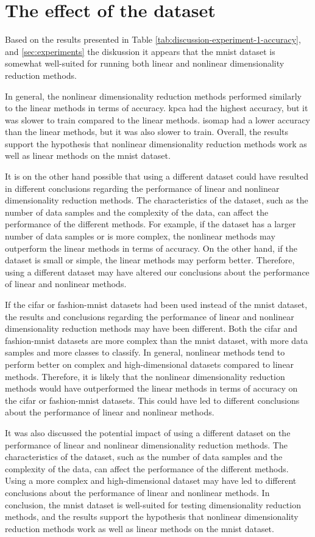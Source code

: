 \section{The effect of the dataset}\label{sec:discussion-of-data}
Based on the results presented in Table \ref{tab:discussion-experiment-1-accuracy}, and \ref{sec:experiments} the diskussion it appears that the \gls{mnist} dataset is somewhat well-suited for running both linear and nonlinear dimensionality reduction methods.  

In general, the nonlinear dimensionality reduction methods performed similarly to the linear methods in terms of accuracy. \gls{kpca} had the highest accuracy, but it was slower to train compared to the linear methods. \gls{isomap} had a lower accuracy than the linear methods, but it was also slower to train. Overall, the results support the hypothesis that nonlinear dimensionality reduction methods work as well as linear methods on the \gls{mnist} dataset.

It is on the other hand possible that using a different dataset could have resulted in different conclusions regarding the performance of linear and nonlinear dimensionality reduction methods. The characteristics of the dataset, such as the number of data samples and the complexity of the data, can affect the performance of the different methods. For example, if the dataset has a larger number of data samples or is more complex, the nonlinear methods may outperform the linear methods in terms of accuracy. On the other hand, if the dataset is small or simple, the linear methods may perform better. Therefore, using a different dataset may have altered our conclusions about the performance of linear and nonlinear methods.

If the \gls{cifar} or \gls{fashion-mnist} datasets had been used instead of the \gls{mnist} dataset, the results and conclusions regarding the performance of linear and nonlinear dimensionality reduction methods may have been different. Both the \gls{cifar} and \gls{fashion-mnist} datasets are more complex than the \gls{mnist} dataset, with more data samples and more classes to classify. In general, nonlinear methods tend to perform better on complex and high-dimensional datasets compared to linear methods. Therefore, it is likely that the nonlinear dimensionality reduction methods would have outperformed the linear methods in terms of accuracy on the \gls{cifar} or \gls{fashion-mnist} datasets. This could have led to different conclusions about the performance of linear and nonlinear methods.

It was also discussed the potential impact of using a different dataset on the performance of linear and nonlinear dimensionality reduction methods. The characteristics of the dataset, such as the number of data samples and the complexity of the data, can affect the performance of the different methods. Using a more complex and high-dimensional dataset may have led to different conclusions about the performance of linear and nonlinear methods. In conclusion, the \gls{mnist} dataset is well-suited for testing dimensionality reduction methods, and the results support the hypothesis that nonlinear dimensionality reduction methods work as well as linear methods on the \gls{mnist} dataset.